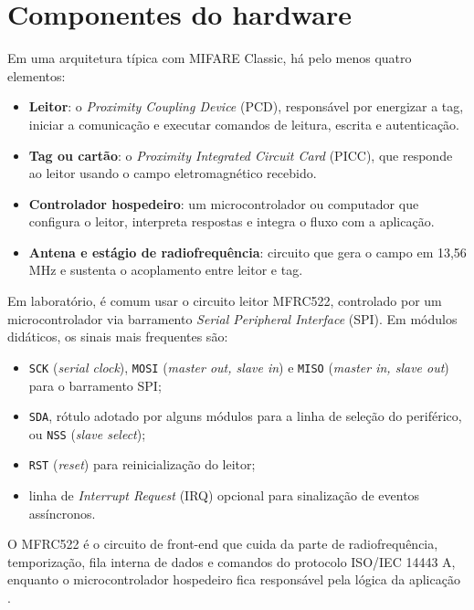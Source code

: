 \section{Componentes do hardware}
Em uma arquitetura típica com MIFARE Classic, há pelo menos quatro elementos:
\begin{itemize}[leftmargin=*]
  \item \textbf{Leitor}: o \textit{Proximity Coupling Device} (PCD), responsável por energizar a tag, iniciar a comunicação e executar comandos de leitura, escrita e autenticação.
  \item \textbf{Tag ou cartão}: o \textit{Proximity Integrated Circuit Card} (PICC), que responde ao leitor usando o campo eletromagnético recebido.
  \item \textbf{Controlador hospedeiro}: um microcontrolador ou computador que configura o leitor, interpreta respostas e integra o fluxo com a aplicação.
  \item \textbf{Antena e estágio de radiofrequência}: circuito que gera o campo em 13,56 MHz e sustenta o acoplamento entre leitor e tag.
\end{itemize}

Em laboratório, é comum usar o circuito leitor MFRC522, controlado por um microcontrolador via barramento \textit{Serial Peripheral Interface} (SPI). Em módulos didáticos, os sinais mais frequentes são:
\begin{itemize}[leftmargin=*]
  \item \texttt{SCK} (\textit{serial clock}), \texttt{MOSI} (\textit{master out, slave in}) e \texttt{MISO} (\textit{master in, slave out}) para o barramento SPI;
  \item \texttt{SDA}, rótulo adotado por alguns módulos para a linha de seleção do periférico, ou \texttt{NSS} (\textit{slave select});
  \item \texttt{RST} (\textit{reset}) para reinicialização do leitor;
  \item linha de \textit{Interrupt Request} (IRQ) opcional para sinalização de eventos assíncronos.
\end{itemize}

O MFRC522 é o circuito de front-end que cuida da parte de radiofrequência, temporização, fila interna de dados e comandos do protocolo ISO/IEC 14443 A, enquanto o microcontrolador hospedeiro fica responsável pela lógica da aplicação \citep{nxp_mfrc522}.

